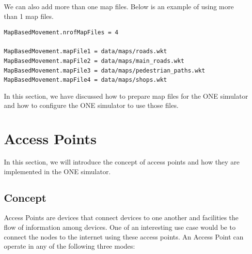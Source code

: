 We can also add more than one map files. Below is an example of using more than 1 map files.

\begin{lstlisting}[language=bash]
MapBasedMovement.nrofMapFiles = 4

MapBasedMovement.mapFile1 = data/maps/roads.wkt
MapBasedMovement.mapFile2 = data/maps/main_roads.wkt
MapBasedMovement.mapFile3 = data/maps/pedestrian_paths.wkt
MapBasedMovement.mapFile4 = data/maps/shops.wkt

\end{lstlisting}

In this section, we have discussed how to prepare map files for the ONE simulator and how to configure the ONE simulator to use those files.

\section{Access Points}
In this section, we will introduce the concept of access points and how they are implemented in the ONE simulator.
\subsection{Concept}
Access Points are devices that connect devices to one another and facilities the flow of information among devices. One of an interesting use case would be to connect the nodes to the internet using these access points. An Access Point can operate in any of the following three modes:

